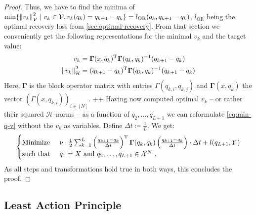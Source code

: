\begin{proof}
	Thus, we have to find the minima of $\min\{\norm{v_k}_\mathcal{V}^2~|~ v_k \in \mathcal{V}, v_k(q_k) = q_{k+1} - q_k\} = l_{\text{OR}}(q_k, q_{k+1} - q_k)$, $l_{\text{OR}}$ being the optimal recovery loss from \cref{sec:optimal-recovery}.
	From that section we conveniently get the following representations for the minimal $v_k$ and the target value:
	\begin{align}
		v_k & = \mathbf{\Gamma}(x, q_k)^\mathrm{T}\mathbf{\Gamma}(q_k, q_k)^{-1} (q_{k+1} - q_k)\\
		\norm{v_k}_\mathcal{H}^2 &= (q_{k+1} - q_k)^\mathrm{T} \mathbf{\Gamma}(q_k, q_k)^{-1} (q_{k+1} - q_k)
	\end{align}
	Here, $\mathbf{\Gamma}$ is the block operator matrix with entries $\Gamma(q_{k,i}, q_{k, j})$ and $\mathbf{\Gamma}(x, q_k)$ the vector $(\Gamma(x, q_{k, i}))_{i \in [N]}$.
	++
	Having now computed optimal $v_k$ -- or rather their squared $\mathcal{H}$-norms -- as a function of $q_2, \ldots, q_{L+1}$ we can reformulate \cref{eq:min-q-v} without the $v_k$ as variables.
	Define $\Delta t \coloneqq \frac{1}{L}$.
	We get:
	\begin{equation}
		\label{eq:}
		\begin{cases}
			\text{Minimize~} & \nu \cdot \frac{1}{2} \sum_{k=1}^{L}  
			\left(\frac{q_{k+1} - q_k}{\Delta t}\right)^\mathrm{T} \mathbf{\Gamma}(q_k, q_k)
			\left(\frac{q_{k+1} - q_k}{\Delta t}\right) \cdot \Delta t
			+ l(q_{L+1}, Y) \\
			\text{such that~} & q_1 = X \text{~and~} q_2, \ldots, q_{L+1} \in \mathcal{X}^N \ .
		\end{cases}
	\end{equation}
	As all steps and transformations hold true in both ways, this concludes the proof.
\end{proof}

\subsection{Least Action Principle}

